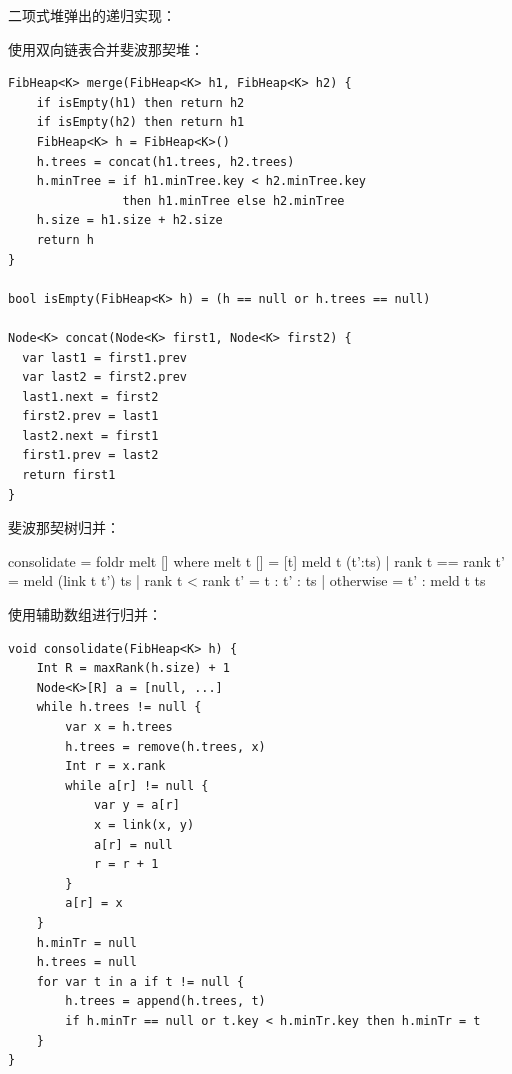 \documentclass[b5paper]{ctexart}
\begin{document}
二项式堆弹出的递归实现：


使用双向链表合并斐波那契堆：

\begin{lstlisting}[language = Bourbaki]
FibHeap<K> merge(FibHeap<K> h1, FibHeap<K> h2) {
    if isEmpty(h1) then return h2
    if isEmpty(h2) then return h1
    FibHeap<K> h = FibHeap<K>()
    h.trees = concat(h1.trees, h2.trees)
    h.minTree = if h1.minTree.key < h2.minTree.key
                then h1.minTree else h2.minTree
    h.size = h1.size + h2.size
    return h
}

bool isEmpty(FibHeap<K> h) = (h == null or h.trees == null)

Node<K> concat(Node<K> first1, Node<K> first2) {
  var last1 = first1.prev
  var last2 = first2.prev
  last1.next = first2
  first2.prev = last1
  last2.next = first1
  first1.prev = last2
  return first1
}
\end{lstlisting}

斐波那契树归并：

\begin{Haskell}
consolidate = foldr melt [] where
    melt t [] = [t]
    meld t (t':ts) | rank t == rank t' = meld (link t t') ts
                   | rank t <  rank t' = t : t' : ts
                   | otherwise = t' : meld t ts
\end{Haskell}

使用辅助数组进行归并：

\begin{lstlisting}[language = Bourbaki]
void consolidate(FibHeap<K> h) {
    Int R = maxRank(h.size) + 1
    Node<K>[R] a = [null, ...]
    while h.trees != null {
        var x = h.trees
        h.trees = remove(h.trees, x)
        Int r = x.rank
        while a[r] != null {
            var y = a[r]
            x = link(x, y)
            a[r] = null
            r = r + 1
        }
        a[r] = x
    }
    h.minTr = null
    h.trees = null
    for var t in a if t != null {
        h.trees = append(h.trees, t)
        if h.minTr == null or t.key < h.minTr.key then h.minTr = t
    }
}
\end{lstlisting}
\end{document}
